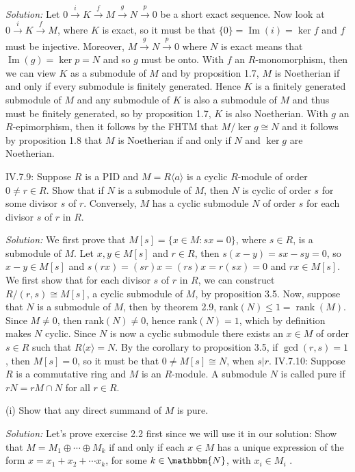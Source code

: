 \documentclass{letter}
\newcommand{\tmem}[1]{{\em #1\/}}
\newcommand{\tmop}[1]{\ensuremath{\operatorname{#1}}}
\begin{document}
{\tmem{Solution:}} Let $0 \overset{i}{\rightarrow} K \overset{f}{\rightarrow}
M \overset{g}{\rightarrow} N \overset{p}{\rightarrow} 0$ be a short exact
sequence. Now look at $0 \overset{i}{\rightarrow} K \overset{f}{\rightarrow}
M$, where $K$ is exact, so it must be that $\{0\}= \tmop{Im} (i) = \ker f$ and
$f$ must be injective. Moreover, $M \overset{g}{\rightarrow} N
\overset{p}{\rightarrow} 0$ where $N$ is exact means that $\tmop{Im} (g) =
\ker p = N$ and so $g$ must be onto. With $f$ an $R$-monomorphism, then we can
view $K$ as a submodule of $M$ and by proposition 1.7, $M$ is Noetherian if
and only if every submodule is finitely generated. Hence $K$ is a finitely
generated submodule of $M$ and any submodule of $K$ is also a submodule of $M$
and thus must be finitely generated, so by proposition 1.7, $K$ is also
Noetherian. With $g$ an $R$-epimorphism, then it follows by the FHTM that $M /
\ker g \cong N$ and it follows by proposition 1.8 that $M$ is Noetherian if
and only if $N$ and $\ker g$ are Noetherian.

IV.7.9: Suppose $R$ is a PID and $M = R \langle a \rangle$ is a cyclic
$R$-module of order $0 \neq r \in R$. Show that if $N$ is a submodule of $M$,
then $N$ is cyclic of order $s$ for some divisor $s$ of $r$. Conversely, $M$
has a cyclic submodule $N$ of order $s$ for each divisor $s$ of $r$ in $R$.

{\tmem{Solution:}} We first prove that $M [s] =\{x \in M : s x = 0\}$, where
$s \in R$, is a submodule of $M$. Let $x, y \in M [s]$ and $r \in R$, then $s
(x - y) = s x - s y = 0$, so $x - y \in M [s]$ and $s (r x) = (s r) x = (r s)
x = r (s x) = 0$ and $r x \in M [s]$. We first show that for each divisor $s$
of $r$ in $R$, we can construct $R / (r, s) \cong M [s]$, a cyclic submodule
of $M$, by proposition 3.5. Now, suppose that $N$ is a submodule of $M$, then
by theorem 2.9, rank$(N) \leq 1 = \tmop{rank} (M)$. Since $M \neq 0$, then
rank$(N) \neq 0$, hence rank$(N) = 1$, which by definition makes $N$ cyclic.
Since $N$ is now a cyclic submodule there exists an $x \in M$ of order $s \in
R$ such that $R \langle x \rangle = N$. By the corollary to proposition 3.5,
if $\gcd (r, s) = 1$, then $M [s] = 0$, so it must be that $0 \neq M [s] \cong
N$, when $s | r$. IV.7.10: Suppose $R$ is a commutative ring and $M$ is an
$R$-module. A submodule $N$ is called pure if $r N = r M \cap N$ for all $r
\in R$.

(i) Show that any direct summand of $M$ is pure.

{\tmem{Solution:}} Let's prove exercise 2.2 first since we will use it in our
solution: Show that $M = M_1 \oplus \cdots \oplus M_k$ if and only if each $x
\in M$ has a unique expression of the form $x = x_1 + x_2 + \cdots x_k$, for
some $k \in \mathbbm{N}$, with $x_i \in M_i$ .
\end{document}
